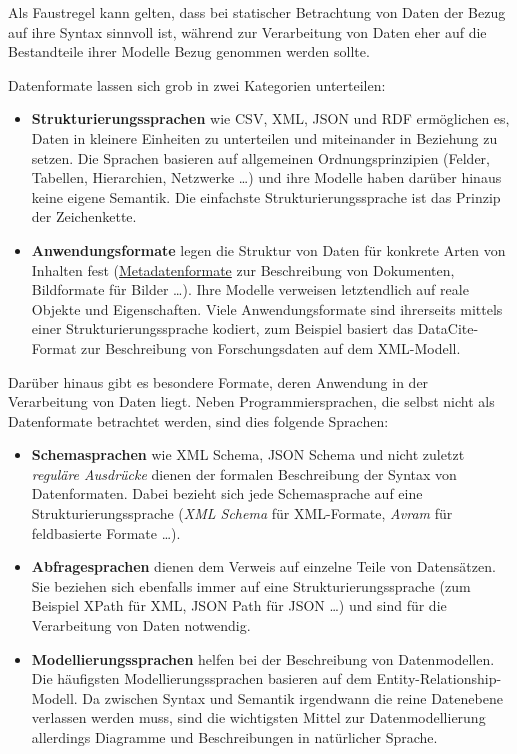 \documentclass[
  11pt,
  letterpaper,
  DIV=11,
  twoside]{scrreprt}
\begin{document}
Als Faustregel kann gelten, dass bei statischer Betrachtung von Daten
der Bezug auf ihre Syntax sinnvoll ist, während zur Verarbeitung von
Daten eher auf die Bestandteile ihrer Modelle Bezug genommen werden
sollte.

Datenformate lassen sich grob in zwei Kategorien unterteilen:

\begin{itemize}
\item
  \textbf{Strukturierungssprachen} wie CSV, XML, JSON und RDF
  ermöglichen es, Daten in kleinere Einheiten zu unterteilen und
  miteinander in Beziehung zu setzen. Die Sprachen basieren auf
  allgemeinen Ordnungsprinzipien (Felder, Tabellen, Hierarchien,
  Netzwerke \ldots) und ihre Modelle haben darüber hinaus keine eigene
  Semantik. Die einfachste Strukturierungssprache ist das Prinzip der
  Zeichenkette.
\item
  \textbf{Anwendungsformate} legen die Struktur von Daten für konkrete
  Arten von Inhalten fest (\hyperref[metadatenformate]{Metadatenformate}
  zur Beschreibung von Dokumenten, Bildformate für Bilder \ldots). Ihre
  Modelle verweisen letztendlich auf reale Objekte und Eigenschaften.
  Viele Anwendungsformate sind ihrerseits mittels einer
  Strukturierungssprache kodiert, zum Beispiel basiert das
  DataCite-Format zur Beschreibung von Forschungsdaten auf dem
  XML-Modell.
\end{itemize}

Darüber hinaus gibt es besondere Formate, deren Anwendung in der
Verarbeitung von Daten liegt. Neben Programmiersprachen, die selbst
nicht als Datenformate betrachtet werden, sind dies folgende Sprachen:

\begin{itemize}
\item
  \textbf{Schemasprachen} wie XML Schema, JSON Schema und nicht zuletzt
  \emph{reguläre Ausdrücke} dienen der formalen Beschreibung der Syntax
  von Datenformaten. Dabei bezieht sich jede Schemasprache auf eine
  Strukturierungssprache (\emph{XML Schema} für XML-Formate,
  \emph{Avram} für feldbasierte Formate \ldots).
\item
  \textbf{Abfragesprachen} dienen dem Verweis auf einzelne Teile von
  Datensätzen. Sie beziehen sich ebenfalls immer auf eine
  Strukturierungssprache (zum Beispiel XPath für XML, JSON Path für JSON
  \ldots) und sind für die Verarbeitung von Daten notwendig.
\item
  \textbf{Modellierungssprachen} helfen bei der Beschreibung von
  Datenmodellen. Die häufigsten Modellierungssprachen basieren auf dem
  Entity-Relationship-Modell. Da zwischen Syntax und Semantik irgendwann
  die reine Datenebene verlassen werden muss, sind die wichtigsten
  Mittel zur Datenmodellierung allerdings Diagramme und Beschreibungen
  in natürlicher Sprache.
\end{itemize}
\end{document}
